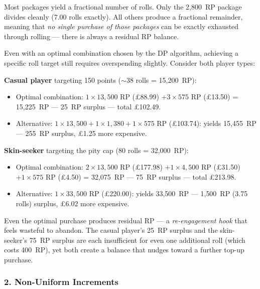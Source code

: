 \documentclass[11pt, a4paper]{article}
\begin{document}
Most packages yield a fractional number of rolls. Only the 2{,}800~RP
package divides cleanly (7.00 rolls exactly). All others produce a
fractional remainder, meaning that \emph{no single purchase of those
packages} can be exactly exhausted through rolling --- there is always
a residual RP balance.

Even with an optimal combination chosen by the DP algorithm, achieving
a specific roll target still requires overspending slightly. Consider
both player types:

\textbf{Casual player} targeting 150 points ($\sim$38 rolls =
15{,}200~RP):

\begin{itemize}[nosep]
    \item Optimal combination: $1 \times 13{,}500$ RP (\pounds88.99)
          $+ 3 \times 575$ RP (\pounds13.50) = 15{,}225~RP ---
          25~RP surplus --- total \pounds102.49.
    \item Alternative: $1 \times 13{,}500 + 1 \times 1{,}380 +
          1 \times 575$ RP (\pounds103.74): yields 15{,}455~RP ---
          255~RP surplus, \pounds1.25 more expensive.
\end{itemize}

\textbf{Skin-seeker} targeting the pity cap (80 rolls = 32{,}000~RP):

\begin{itemize}[nosep]
    \item Optimal combination: $2 \times 13{,}500$ RP (\pounds177.98)
          $+ 1 \times 4{,}500$ RP (\pounds31.50) $+ 1 \times 575$ RP
          (\pounds4.50) = 32{,}075~RP --- 75~RP surplus ---
          total \pounds213.98.
    \item Alternative: $1 \times 33{,}500$ RP (\pounds220.00):
          yields 33{,}500~RP --- 1{,}500~RP (3.75 rolls) surplus,
          \pounds6.02 more expensive.
\end{itemize}

\noindent Even the optimal purchase produces residual RP --- a
\emph{re-engagement hook} that feels wasteful to abandon. The casual
player's 25~RP surplus and the skin-seeker's 75~RP surplus are each
insufficient for even one additional roll (which costs 400~RP), yet
both create a balance that nudges toward a further top-up purchase.

\subsubsection*{2. Non-Uniform Increments}
\end{document}
